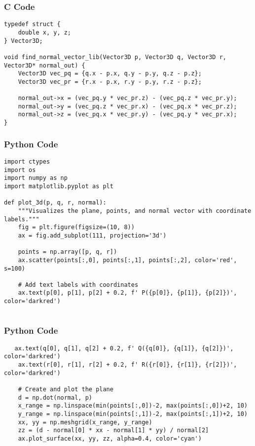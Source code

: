 \documentclass{beamer}
\begin{document}
    \begin{frame}[fragile]
        \frametitle{C Code}
        \begin{lstlisting}
typedef struct {
    double x, y, z;
} Vector3D;

void find_normal_vector_lib(Vector3D p, Vector3D q, Vector3D r, Vector3D* normal_out) {
    Vector3D vec_pq = {q.x - p.x, q.y - p.y, q.z - p.z};
    Vector3D vec_pr = {r.x - p.x, r.y - p.y, r.z - p.z};
    
    normal_out->x = (vec_pq.y * vec_pr.z) - (vec_pq.z * vec_pr.y);
    normal_out->y = (vec_pq.z * vec_pr.x) - (vec_pq.x * vec_pr.z);
    normal_out->z = (vec_pq.x * vec_pr.y) - (vec_pq.y * vec_pr.x);
}
        \end{lstlisting}
    \end{frame}
    
   
    
    \begin{frame}[fragile]
        \frametitle{Python Code}
        \begin{lstlisting}
import ctypes
import os
import numpy as np
import matplotlib.pyplot as plt

def plot_3d(p, q, r, normal):
    """Visualizes the plane, points, and normal vector with coordinate labels."""
    fig = plt.figure(figsize=(10, 8))
    ax = fig.add_subplot(111, projection='3d')

    points = np.array([p, q, r])
    ax.scatter(points[:,0], points[:,1], points[:,2], color='red', s=100)

    # Add text labels with coordinates
    ax.text(p[0], p[1], p[2] + 0.2, f' P({p[0]}, {p[1]}, {p[2]})', color='darkred')
  

        \end{lstlisting}
    \end{frame}
    
    \begin{frame}[fragile]
        \frametitle{Python Code}
        \begin{lstlisting}
   ax.text(q[0], q[1], q[2] + 0.2, f' Q({q[0]}, {q[1]}, {q[2]})', color='darkred')
    ax.text(r[0], r[1], r[2] + 0.2, f' R({r[0]}, {r[1]}, {r[2]})', color='darkred')
    
    # Create and plot the plane
    d = np.dot(normal, p)
    x_range = np.linspace(min(points[:,0])-2, max(points[:,0])+2, 10)
    y_range = np.linspace(min(points[:,1])-2, max(points[:,1])+2, 10)
    xx, yy = np.meshgrid(x_range, y_range)
    zz = (d - normal[0] * xx - normal[1] * yy) / normal[2]
    ax.plot_surface(xx, yy, zz, alpha=0.4, color='cyan')

    
   
        \end{lstlisting}
    \end{frame}
    
\end{document}
